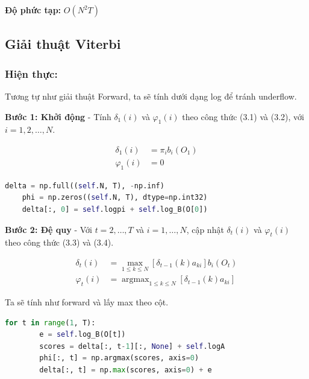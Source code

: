 \documentclass[twoside, final]{hcmut_report}
\begin{document}
\textbf{Độ phức tạp:} $O(N^2T)$

\subsection{Giải thuật Viterbi}
\subsubsection*{Hiện thực:  }

Tương tự như giải thuật Forward, ta sẽ tính dưới dạng log để tránh underflow.

\textbf{Bước 1: Khởi động} - Tính $\delta_1(i)$ và $\varphi_1(i)$ theo công thức (3.1) và (3.2), với $i = 1, 2, \ldots, N$.

\begin{align}
\delta_1(i) &= \pi_i b_i(O_1) \tag{3.1} \\
\varphi_1(i) &= 0 \tag{3.2}
\end{align}

\begin{tcolorbox}
\begin{lstlisting}[language=Python]
    delta = np.full((self.N, T), -np.inf)
    phi = np.zeros((self.N, T), dtype=np.int32)
    delta[:, 0] = self.logpi + self.log_B(O[0])
\end{lstlisting}
\end{tcolorbox}

\textbf{Bước 2: Đệ quy} - Với $t = 2, \ldots, T$ và $i = 1, \ldots, N$, cập nhật $\delta_t(i)$ và $\varphi_t(i)$ theo công thức (3.3) và (3.4).

\begin{align}
\delta_t(i) &= \max_{1 \leq k \leq N} \left[\delta_{t-1}(k) a_{ki}\right] b_i(O_t) \tag{3.3} \\
\varphi_t(i) &= \operatorname{argmax}_{1 \leq k \leq N} \left[\delta_{t-1}(k) a_{ki}\right] \tag{3.4}
\end{align}

Ta sẽ tính như forward và lấy max theo cột.

\begin{tcolorbox}
\begin{lstlisting}[language=Python]
    for t in range(1, T):
        e = self.log_B(O[t])
        scores = delta[:, t-1][:, None] + self.logA
        phi[:, t] = np.argmax(scores, axis=0)
        delta[:, t] = np.max(scores, axis=0) + e
\end{lstlisting}
\end{tcolorbox}
\end{document}
